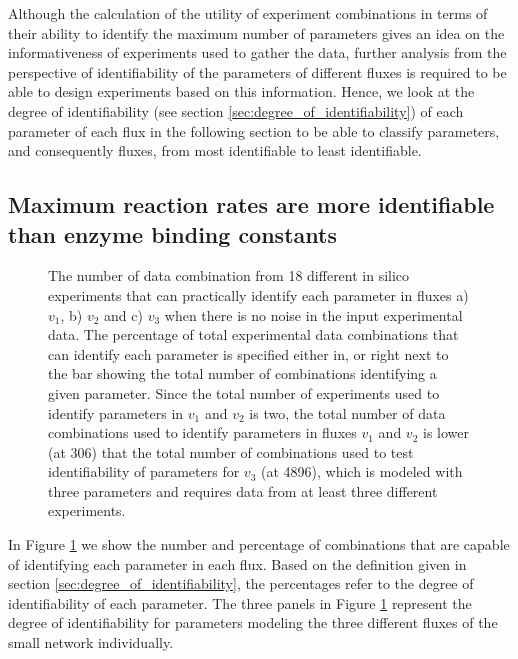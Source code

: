 \documentclass[10pt]{article}
\begin{document}
Although the calculation of the utility of experiment combinations in terms of their ability to identify the maximum number of parameters gives an idea on the informativeness of experiments used to gather the data, further analysis from the perspective of identifiability of the parameters of different fluxes is required to be able to design experiments based on this information. Hence, we look at the degree of identifiability (see section \ref{sec:degree_of_identifiability}) of each parameter of each flux in the following section to be able to classify parameters, and consequently fluxes, from most identifiable to least identifiable.

\subsection{Maximum reaction rates are more identifiable than enzyme binding constants}\label{sec:trends}
\begin{figure}[!tbhp]
	\caption{The number of data combination from 18 different in silico experiments that can practically identify each parameter in fluxes a) $v_1$, b) $v_2$ and c) $v_3$ when there is no noise in the input experimental data. The percentage of total experimental data combinations that can identify each parameter is specified either in, or right next to the bar showing the total number of combinations identifying a given parameter. Since the total number of experiments used to identify parameters in $v_1$ and $v_2$ is two, the total number of data combinations used to identify parameters in fluxes $v_1$ and $v_2$ is lower (at 306) that the total number of combinations used to test identifiability of parameters for $v_3$ (at 4896), which is modeled with three parameters and requires data from at least three different experiments.}\label{fig:figure1}
\end{figure}
In Figure \ref{fig:figure1} we show the number and percentage of combinations that are capable of identifying each parameter in each flux. Based on the definition given in section \ref{sec:degree_of_identifiability}, the percentages refer to the degree of identifiability of each parameter. The three panels in Figure \ref{fig:figure1} represent the degree of identifiability for parameters modeling the three different fluxes of the small network individually. 
\end{document}
